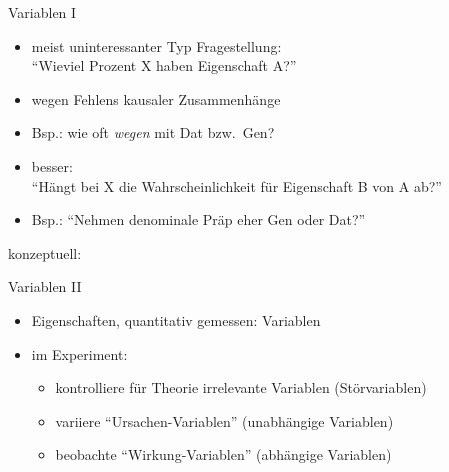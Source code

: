 \begin{frame}
  {Variablen I}
  \begin{itemize}[<+->]
    \item meist uninteressanter Typ Fragestellung:\\
      "`Wieviel Prozent X haben Eigenschaft A?"'
    \item wegen \alert{Fehlens kausaler Zusammenhänge}
    \item Bsp.: wie oft \textit{wegen} mit Dat bzw.\ Gen?
    \item besser:\\
      \alert{"`Hängt bei X die Wahrscheinlichkeit für Eigenschaft B von A ab?"'}
    \item Bsp.: "`Nehmen denominale Präp eher Gen oder Dat?"'
  \end{itemize}
  \pause
  \begin{center}
    konzeptuell:
  \end{center}
\end{frame}

\begin{frame}
  {Variablen II}
  \begin{itemize}[<+->]
    \item Eigenschaften, quantitativ gemessen: \alert{Variablen}
    \item im Experiment:
      \begin{itemize}[<+->]
	\item \alert{kontrolliere} für Theorie irrelevante Variablen (\alert{Störvariablen})
	\item \alert{variiere} "`Ursachen-Variablen"' (\alert{unabhängige Variablen})
	\item \alert{beobachte} "`Wirkung-Variablen"' (\alert{abhängige Variablen})
      \end{itemize}
  \end{itemize}
\end{frame}

